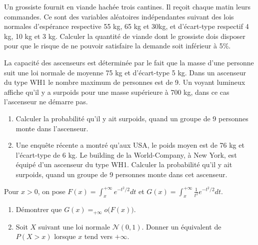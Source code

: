 \documentclass[../PolyS4.tex]{subfiles}
\begin{document}



Un grossiste fournit en viande hachée trois cantines. Il reçoit chaque matin leurs commandes. Ce sont des variables aléatoires indépendantes
suivant des lois normales d'espérance respective 55 kg, 65 kg et 30kg, et d'écart-type respectif 4 kg, 10 kg et 3 kg. Calculer la quantité de viande dont
le grossiste dois disposer pour que le risque de ne pouvoir satisfaire la demande soit inférieur à 5\%.\\





La capacité des ascenseurs est déterminée par le fait que la
masse d'une personne suit une loi normale de moyenne 75 kg et d'écart-type
5 kg. Dans un ascenseur du type WH1 le nombre maximum de personnes est
de 9. Un voyant lumineux affiche qu'il y a surpoids pour une masse supérieure
à 700 kg, dans ce cas l'ascenseur ne démarre pas.
\begin{enumerate}
\item Calculer la probabilité qu'il y ait surpoids, quand un groupe de 9 personnes
monte dans l'ascenseur.
\item Une enquête récente a montré qu'aux USA, le poids moyen est de 76 kg
et l'écart-type de 6 kg. Le building de la World-Company, à New York,
est équipé d'un ascenseur du type WH1. Calculer la probabilité qu'il y
ait surpoids, quand un groupe de 9 personnes monte dans cet ascenseur.\\
\end{enumerate}





Pour $x>0$, on pose $F(x)=\int_{x}^{+\infty}e^{-t^2/2}dt$ et $G(x)=\int_{x}^{+\infty}\frac1{t^2}e^{-t^2/2}dt$.
\begin{enumerate}
 \item Démontrer que $G(x)=_{+\infty}o\big(F(x)\big)$.
\item Soit $X$ suivant une loi normale $\mathcal N(0,1)$. Donner un équivalent de $P(X>x)$ lorsque $x$
tend vers $+\infty$.\\
\end{enumerate}
\end{document}
